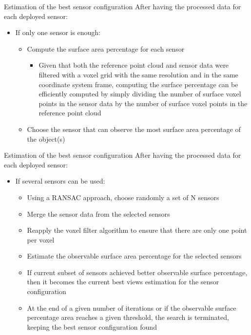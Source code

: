 \begin{frame}{Estimation of the best sensor configuration}
	After having the processed data for each deployed sensor:
	\begin{itemize}
		\item If only one sensor is enough:
		\begin{itemize}
			\item Compute the surface area percentage for each sensor
			\begin{itemize}
				\item Given that both the reference point cloud and sensor data were filtered with a voxel grid with the same resolution and in the same coordinate system frame, computing the surface percentage can be efficiently computed by simply dividing the number of surface voxel points in the sensor data by the number of surface voxel points in the reference point cloud
			\end{itemize}
			\item Choose the sensor that can observe the most surface area percentage of the object(s)
		\end{itemize}
	\end{itemize}
\end{frame}


\begin{frame}{Estimation of the best sensor configuration}
	After having the processed data for each deployed sensor:
	\begin{itemize}
		\item If several sensors can be used:
		\begin{itemize}
			\item Using a RANSAC approach, choose randomly a set of N sensors
			\item Merge the sensor data from the selected sensors
			\item Reapply the voxel filter algorithm to ensure that there are only one point per voxel
			\item Estimate the observable surface area percentage for the selected sensors
			\item If current subset of sensors achieved better observable surface percentage, then it becomes the current best views estimation for the sensor configuration
			\item At the end of a given number of iterations or if the observable surface percentage area reaches a given threshold, the search is terminated, keeping the best sensor configuration found
		\end{itemize}
	\end{itemize}
\end{frame}
